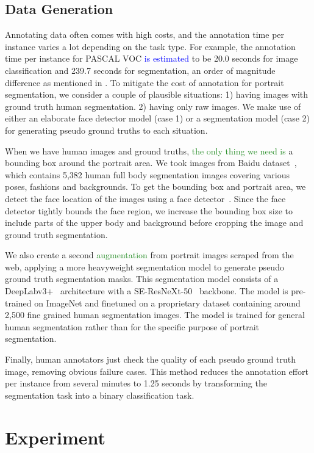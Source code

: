 \documentclass[10pt,twocolumn,letterpaper]{article}
\newcommand\Lars[1]{\textcolor{blue}{#1}}
\newcommand\yj[1]{\textcolor{ForestGreen}{#1}}
\newcommand\Lars[1]{#1}
\newcommand\yj[1]{#1}
\begin{document}
\subsection{Data Generation}
\label{sec:data}
Annotating data often comes with high costs, and the annotation time per instance varies a lot depending on the task type. For example, the annotation time per instance for PASCAL VOC \Lars{is estimated} to be 20.0 seconds for image classification and 239.7 seconds for segmentation, an order of magnitude difference as mentioned in \cite{bearman2016s} .
To mitigate the cost of annotation for portrait segmentation, we consider a couple of plausible situations: 1) having images with ground truth human segmentation.
2) having only raw images.
We make use of either an elaborate face detector model (case 1) or a segmentation model (case 2) for generating pseudo ground truths to each situation. 

When we have human images and ground truths, \yj{the only thing  we need is} a bounding box around the portrait area.
We took images from Baidu dataset~\cite{wu2014early}, which contains 
5,382 human full body segmentation images covering various poses, fashions and backgrounds.  
To get the bounding box and portrait area, we detect the face location of the images using a face detector~\cite{yoo2019extd}.
Since the face detector tightly bounds the face region, we increase the bounding box size to include parts of the upper body and background before cropping the image and ground truth segmentation.

We also create a second \yj{augmentation} from portrait images scraped from the web, applying a more heavyweight segmentation model to generate pseudo ground truth segmentation masks.
This segmentation model consists of a  DeepLabv3+~\cite{deeplabv3plus2018} architecture with a SE-ResNeXt-50~\cite{xie2017aggregated} backbone. The model is pre-trained on ImageNet and finetuned on a proprietary dataset containing around 2,500 fine grained human segmentation images. The model is trained for general human segmentation rather than for the specific purpose of portrait segmentation. 


Finally, human annotators just check the quality of each pseudo ground truth image, removing obvious failure cases. 
This method reduces the annotation effort per instance from several minutes to 1.25 seconds by transforming the segmentation task into a binary classification task.

 
\section{Experiment}
\label{sec:exp}
\end{document}
